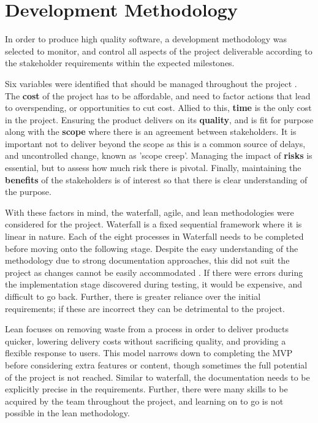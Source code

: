 \section{Development Methodology}
In order to produce high quality software, a development methodology was selected to monitor, and control all aspects of the project deliverable according to the stakeholder requirements within the expected milestones. 

Six variables were identified that should be managed throughout the project \cite{prince2}. The \textbf{cost} of the project has to be affordable, and need to factor actions that lead to overspending, or opportunities to cut cost. Allied to this, \textbf{time} is the only cost in the project. Ensuring the product delivers on its \textbf{quality}, and is fit for purpose along with the \textbf{scope} where there is an agreement between stakeholders. It is important not to deliver beyond the scope as this is a common source of delays, and uncontrolled change, known as 'scope creep'. Managing the impact of \textbf{risks} is essential, but to assess how much risk there is pivotal. Finally, maintaining the \textbf{benefits} of the stakeholders is of interest so that there is clear understanding of the purpose.

With these factors in mind, the waterfall, agile, and lean methodologies were considered for the project. Waterfall is a fixed sequential framework where it is linear in nature. Each of the eight processes in Waterfall needs to be completed before moving onto the following stage. Despite the easy understanding of the methodology due to strong documentation approaches, this did not suit the project as changes cannot be easily accommodated \cite{smartsheet}. If there were errors during the implementation stage discovered during testing, it would be expensive, and difficult to go back. Further, there is greater reliance over the initial requirements; if these are incorrect they can be detrimental to the project. 

Lean focuses on removing waste from a process in order to deliver products quicker, lowering delivery costs without sacrificing quality, and providing a flexible response to users. This model narrows down to completing the MVP before considering extra features or content, though sometimes the full potential of the project is not reached. Similar to waterfall, the documentation needs to be explicitly precise in the requirements. Further, there were many skills to be acquired by the team throughout the project, and learning on to go is not possible in the lean methodology.

